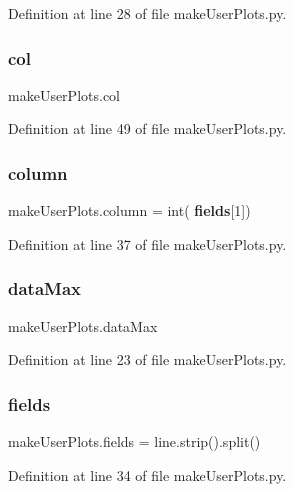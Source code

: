 Definition at line 28 of file make\+User\+Plots.\+py.

\mbox{\label{namespacemake_user_plots_a1bc2e0a47939a6beac80c12dc6157e0b}} 
\subsubsection{col}
{\footnotesize\ttfamily make\+User\+Plots.\+col}



Definition at line 49 of file make\+User\+Plots.\+py.

\mbox{\label{namespacemake_user_plots_a5654c5f65d93c3b18a16dc6cb6328418}} 
\subsubsection{column}
{\footnotesize\ttfamily make\+User\+Plots.\+column = int(\textbf{ fields}[1])}



Definition at line 37 of file make\+User\+Plots.\+py.

\mbox{\label{namespacemake_user_plots_aa88f63a69469551507b72e11ef13c2cc}} 
\subsubsection{data\+Max}
{\footnotesize\ttfamily make\+User\+Plots.\+data\+Max}



Definition at line 23 of file make\+User\+Plots.\+py.

\mbox{\label{namespacemake_user_plots_a6a23d52171367149ad50ac97bcb613c0}} 
\subsubsection{fields}
{\footnotesize\ttfamily make\+User\+Plots.\+fields = line.\+strip().split()}



Definition at line 34 of file make\+User\+Plots.\+py.

\mbox{\label{namespacemake_user_plots_ad07936e0679442db524512aafa16a992}} 
